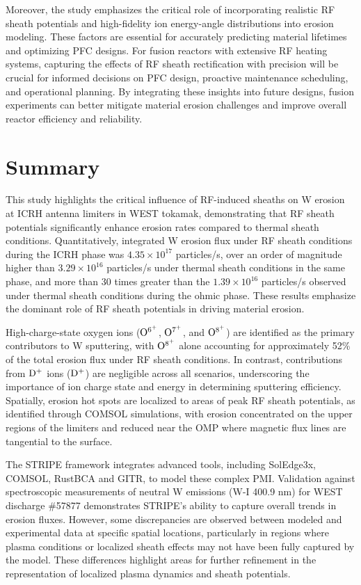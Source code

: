 \documentclass[10pt]{iopart}
\begin{document}
Moreover, the study emphasizes the critical role of incorporating realistic RF sheath potentials and high-fidelity ion energy-angle distributions into erosion modeling. These factors are essential for accurately predicting material lifetimes and optimizing PFC designs. For fusion reactors with extensive RF heating systems, capturing the effects of RF sheath rectification with precision will be crucial for informed decisions on PFC design, proactive maintenance scheduling, and operational planning. By integrating these insights into future designs, fusion experiments can better mitigate material erosion challenges and improve overall reactor efficiency and reliability.

\section{Summary}
\label{sec:8}

This study highlights the critical influence of RF-induced sheaths on W erosion at ICRH antenna limiters in WEST tokamak, demonstrating that RF sheath potentials significantly enhance erosion rates compared to thermal sheath conditions. Quantitatively, integrated W erosion flux under RF sheath conditions during the ICRH phase was \(4.35 \times 10^{17}\) particles/s, over an order of magnitude higher than \(3.29 \times 10^{16}\) particles/s under thermal sheath conditions in the same phase, and more than 30 times greater than the \(1.39 \times 10^{16}\) particles/s observed under thermal sheath conditions during the ohmic phase. These results emphasize the dominant role of RF sheath potentials in driving material erosion.

High-charge-state oxygen ions (\(\rm O^{6^+}\), \(\rm O^{7^+}\), and \(\rm O^{8^+}\)) are identified as the primary contributors to W sputtering, with \(\rm O^{8^+}\) alone accounting for approximately 52\% of the total erosion flux under RF sheath conditions. In contrast, contributions from $\rm D^+$ ions (\(\rm D^+\)) are negligible across all scenarios, underscoring the importance of ion charge state and energy in determining sputtering efficiency. Spatially, erosion hot spots are localized to areas of peak RF sheath potentials, as identified through COMSOL simulations, with erosion concentrated on the upper regions of the limiters and reduced near the OMP where magnetic flux lines are tangential to the surface.

The STRIPE framework integrates advanced tools, including SolEdge3x, COMSOL, RustBCA and GITR, to model these complex PMI. Validation against spectroscopic measurements of neutral W emissions (W-I 400.9 nm) for WEST discharge \#57877 demonstrates STRIPE’s ability to capture overall trends in erosion fluxes. However, some discrepancies are observed between modeled and experimental data at specific spatial locations, particularly in regions where plasma conditions or localized sheath effects may not have been fully captured by the model. These differences highlight areas for further refinement in the representation of localized plasma dynamics and sheath potentials.
\end{document}
